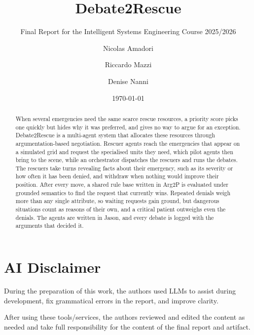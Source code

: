 \documentclass{scrartcl}
\title{\LARGE
    Debate2Rescue\\
}
\subtitle{Final Report for the Intelligent Systems Engineering Course 2025/2026}
\author{
    Nicolas Amadori \\ \emailaddr{nicolas.amadori@studio.unibo.it}
    \and
    Riccardo Mazzi \\ \emailaddr{riccardo.mazzi@studio.unibo.it}
    \and
    Denise Nanni \\ \emailaddr{denise.nanni@studio.unibo.it}
}
\date{\today}
\begin{document}
\maketitle

\begin{abstract}
When several emergencies need the same scarce rescue resources, a priority score picks one quickly but hides why it was preferred, and gives no way to argue for an exception.
Debate2Rescue is a multi-agent system that allocates these resources through argumentation-based negotiation.
Rescuer agents reach the emergencies that appear on a simulated grid and request the specialised units they need, which pilot agents then bring to the scene, while an orchestrator dispatches the rescuers and runs the debates.
The rescuers take turns revealing facts about their emergency, such as its severity or how often it has been denied, and withdraw when nothing would improve their position.
After every move, a shared rule base written in Arg2P is evaluated under grounded semantics to find the request that currently wins.
Repeated denials weigh more than any single attribute, so waiting requests gain ground, but dangerous situations count as reasons of their own, and a critical patient outweighs even the denials.
The agents are written in Jason, and every debate is logged with the arguments that decided it.
\end{abstract}

\section*{AI Disclaimer}

During the preparation of this work, the authors used LLMs to assist during development, fix grammatical errors in the report, and improve clarity.

After using these tools/services, the authors reviewed and edited the content as needed and take full responsibility for the content of the final report and artifact.











\end{document}
